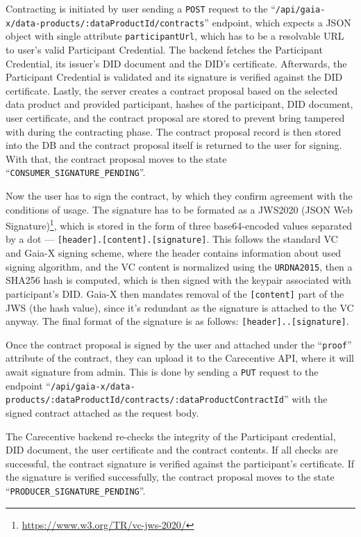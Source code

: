 Contracting is initiated by user sending a \texttt{POST} request to the ``\texttt{/api/gaia-x/data-products/:dataProductId/contracts}'' endpoint, which expects a JSON object with single attribute \texttt{participantUrl}, which has to be a resolvable URL to user's valid Participant Credential.
The backend fetches the Participant Credential, its issuer's DID document and the DID's certificate.
Afterwards, the Participant Credential is validated and its signature is verified against the DID certificate.
Lastly, the server creates a contract proposal based on the selected data product and provided participant, hashes of the participant, DID document, user certificate, and the contract proposal are stored to prevent bring tampered with during the contracting phase.
The contract proposal record is then stored into the DB and the contract proposal itself is returned to the user for signing.
With that, the contract proposal moves to the state ``\texttt{CONSUMER\_SIGNATURE\_PENDING}''.

Now the user has to sign the contract, by which they confirm agreement with the conditions of usage.
The signature has to be formated as a JWS2020 (JSON Web Signature)\footnote{\url{https://www.w3.org/TR/vc-jws-2020/}}, which is stored in the form of three base64-encoded values separated by a dot --- \texttt{[header].[content].[signature]}.
This follows the standard VC and Gaia-X signing scheme, where the header contains information about used signing algorithm, and the VC content is normalized using the \texttt{URDNA2015}, then a SHA256 hash is computed, which is then signed with the keypair associated with participant's DID.
Gaia-X then mandates removal of the \texttt{[content]} part of the JWS (the hash value), since it's redundant as the signature is attached to the VC anyway.
The final format of the signature is as follows: \texttt{[header]..[signature]}.

Once the contract proposal is signed by the user and attached under the ``\texttt{proof}'' attribute of the contract, they can upload it to the Carecentive API, where it will await signature from admin.
This is done by sending a \texttt{PUT} request to the endpoint ``\texttt{/api/gaia-x/data-products/:dataProductId/contracts/:dataProductContractId}'' with the signed contract attached as the request body.

The Carecentive backend re-checks the integrity of the Participant credential, DID document, the user certificate and the contract contents.
If all checks are successful, the contract signature is verified against the participant's certificate.
If the signature is verified successfully, the contract proposal moves to the state ``\texttt{PRODUCER\_SIGNATURE\_PENDING}''.

